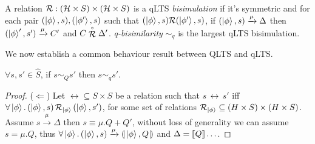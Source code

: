
\begin{definition}
	A relation $\mathcal{R} : (\mathcal{H} \times S) \times (\mathcal{H} \times S)$ is a qLTS \emph{bisimulation} if it's symmetric and for each pair $(\ket{\phi}, s), (\ket{\phi'}, s)$ such that $(\ket{\phi}, s) \mathcal{R} (\ket{\phi'}, s)$,
	if $(\ket{\phi}, s) \xrightarrow{\mu} \Delta$ then $(\ket{\phi}', s') \xrightarrow{\mu} C'$ and $C \stackrel{\scriptscriptstyle \circ}{\mathcal{R}} \Delta'$.
	\emph{q-bisimilarity} $\sim_q$ is the largest qLTS bisimulation.
\end{definition}

We now establish a common behaviour result between QLTS and qLTS.
\begin{theorem}
  $\forall s, s' \in \hat{S}$, if $s \sim_Q s'$ then $s \sim_q s'$.
\end{theorem}
\begin{proof}
  ($\Longleftarrow$) Let $\rel \subseteq S \times S$ be a relation such that $s\,\rel\,s'$ iff $\forall \ket{\phi} \ldotp (\ket{\phi}, s)\,\mathcal{R}_{\ket{\phi}}\,(\ket{\phi}, s')$,
  for some set of relations $\mathcal{R}_{\ket{\phi}} \subseteq (H \times S) \times (H \times S)$.
  Assume $s \xrightarrow{\mu} \Delta$ then $s \equiv \mu.Q + Q'$, without loss of generality we can assume $s = \mu.Q$,
  thus $\forall \ket{\phi} \ldotp (\ket{\phi}, s) \xrightarrow{\mu} \llparenthesis\,\ket{\phi}, Q\,\rrparenthesis$ and $\Delta = \llbracket Q\rrbracket \ldots$.
\end{proof}
